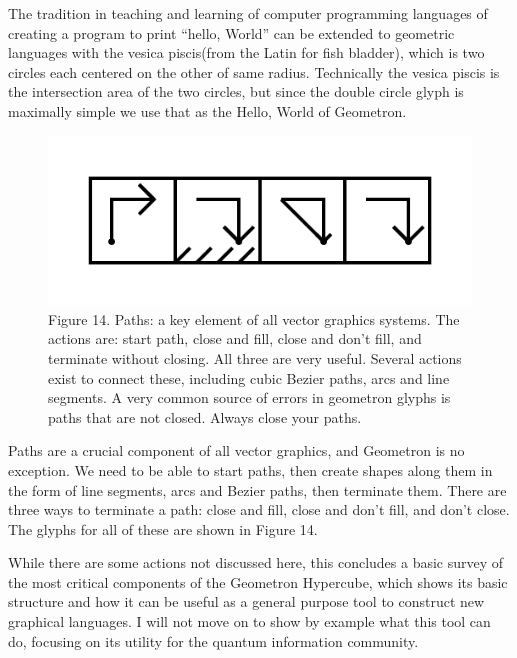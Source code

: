 \documentclass[11pt]{article}
\begin{document}
    The tradition in teaching and learning of computer programming languages of creating a program to print ``hello, World'' can be extended to geometric languages with the vesica piscis(from the Latin for fish bladder), which is two circles each centered on the other of same radius.  Technically the vesica piscis is the intersection area of the two circles, but since the double circle glyph is maximally simple we use that as the Hello, World of Geometron.



\begin{figure}

\includegraphics[width=\linewidth]{figures/figure14_paths.png}

\caption{Figure 14. Paths: a key element of all vector graphics systems.  The actions are: start path, close and fill, close and don't fill, and terminate without closing.  All three are very useful.  Several actions exist to connect these, including cubic Bezier paths, arcs and line segments.  A very common source of errors in geometron glyphs is paths that are not closed.  Always close your paths. }
\end{figure}


    Paths are a crucial component of all vector graphics, and Geometron is no exception.  We need to be able to start paths, then create shapes along them in the form of line segments, arcs and Bezier paths, then terminate them.  There are three ways to terminate a path: close and fill, close and don't fill, and don't close.  The glyphs for all of these are shown in Figure 14.  




    While there are some actions not discussed here, this concludes a basic survey of the most critical components of the Geometron Hypercube, which shows its basic structure and how it can be useful as a general purpose tool to construct new graphical languages.  I will not move on to show by example what this tool can do, focusing on its utility for the quantum information community.
\end{document}
